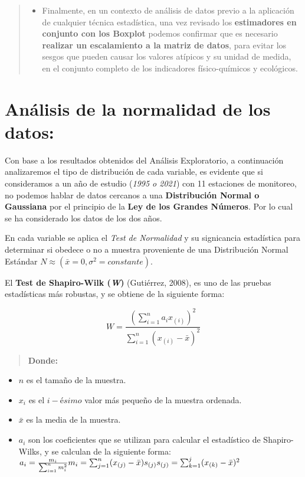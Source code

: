 \documentclass[
  10pt,
  letterpaper,
  DIV=11,
  numbers=noendperiod]{scrreprt}
\providecommand{\tightlist}{%
  \setlength{\itemsep}{0pt}\setlength{\parskip}{0pt}}\usepackage{longtable,booktabs,array}
\begin{document}
\begin{quote}
\begin{itemize}
\tightlist
\item
  Finalmente, en un contexto de análisis de datos previo a la aplicación
  de cualquier técnica estadística, una vez revisado los
  \textbf{estimadores en conjunto con los Boxplot} podemos confirmar que
  es necesario \textbf{realizar un escalamiento a la matriz de datos},
  para evitar los sesgos que pueden causar los valores atípicos y su
  unidad de medida, en el conjunto completo de los indicadores
  físico-químicos y ecológicos.
\end{itemize}
\end{quote}

\hypertarget{anuxe1lisis-de-la-normalidad-de-los-datos}{%
\chapter{Análisis de la normalidad de los
datos:}\label{anuxe1lisis-de-la-normalidad-de-los-datos}}

Con base a los resultados obtenidos del Análisis Exploratorio, a
continuación analizaremos el tipo de distribución de cada variable, es
evidente que si consideramos a un año de estudio (\emph{1995 o 2021})
con 11 estaciones de monitoreo, no podemos hablar de datos cercanos a
una \textbf{Distribución Normal o Gaussiana} por el principio de la
\textbf{Ley de los Grandes Números}. Por lo cual se ha considerado los
datos de los dos años.

En cada variable se aplica el \emph{Test de Normalidad} y su signicancia
estadística para determinar si obedece o no a muestra proveniente de una
Distribución Normal Estándar
\(N\approx (\bar{x}=0,\sigma^{2}=constante)\).

El \textbf{Test de Shapiro-Wilk (\emph{W})} (Gutiérrez, 2008), es uno de
las pruebas estadísticas más robustas, y se obtiene de la siguiente
forma:

\[W = \frac{{\left(\sum_{i=1}^{n} a_i x_{(i)}\right)^2}}{{\sum_{i=1}^{n} (x_{(i)} - \bar{x})^2}}\]

\begin{quote}
\textbf{Donde:}
\end{quote}

\begin{itemize}
\tightlist
\item
  \(n\) es el tamaño de la muestra.
\item
  \(x_{i}\) es el \(i-ésimo\) valor más pequeño de la muestra ordenada.
\item
  \(\bar{x}\) es la media de la muestra.
\item
  \(a_{i}\) son los coeficientes que se utilizan para calcular el
  estadístico de Shapiro-Wilks, y se calculan de la siguiente forma:
  \(\\ a_i = \frac{{m_i}}{{\sum_{i=1}^{n} m_i^2}} \\ m_i = \sum_{j=1}^{n} (x_{(j)} - \bar{x}) s_{(j)} \\ s_{(j)} = \sum_{k=1}^{j} (x_{(k)} - \bar{x})^2 \\\)
\end{itemize}
\end{document}
